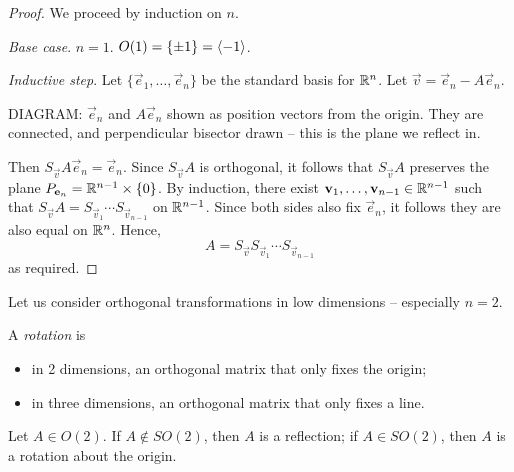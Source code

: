\documentclass{../../template/note}
\begin{document}
    \begin{proof}
        We proceed by induction on \(n\).

        \emph{Base case}. \(n=1\). \(O(1) = \{\pm 1\} = \left \langle -1 \right \rangle\).

        \emph{Inductive step}. Let \(\{\vec e_1, \dots, \vec e_n\}\) be the standard basis for \(\mathbb R^n\). Let \(\vec v = \vec e_n - A \vec e_n\).

        DIAGRAM: \(\vec e_n\) and \(A \vec e_n\) shown as position vectors from the origin. They are connected, and perpendicular bisector drawn -- this is the plane we reflect in.

        Then \(S_{\vec v}A \vec e_n = \vec e_n\). Since \(S_{\vec v}A\) is orthogonal, it follows that \(S_{\vec v}A\) preserves the plane \(P_{\vec e_n} = \RR^{n-1} \times \{0\}\). By induction, there exist \(\vec v_1, \dots, \vec v_{n-1} \in \RR^{n-1}\) such that \(S_{\vec v}A = S_{\vec v_1} \cdots S_{\vec v_{n-1}}\) on \(\mathbb R^{n-1}\). Since both sides also fix \(\vec e_n\), it follows they are also equal on \(\mathbb R^n\). Hence,
        \[  
            A = S_{\vec v}S_{\vec v_1} \cdots S_{\vec v_{n-1}}
        \]
        as required.
    \end{proof}
    
    Let us consider orthogonal transformations in low dimensions -- especially \(n=2\).

    \begin{definition}[Rotations]
        A \emph{rotation} is
        \begin{itemize}
            \item in 2 dimensions, an orthogonal matrix that only fixes the origin;
            \item in three dimensions, an orthogonal matrix that only fixes a line.
        \end{itemize}
    \end{definition}
    
    

    \begin{lemma}[Elements of \(O(2)\)]
        Let \(A \in O(2)\). If \(A \notin SO(2)\), then \(A\) is a reflection; if \(A \in SO(2)\), then \(A\) is a rotation about the origin.
    \end{lemma}
    
\end{document}
